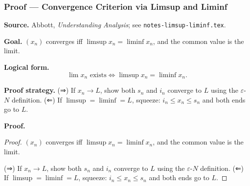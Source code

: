 
\clearpage
{}
\hypertarget{proof-RA-ABB-T-limsup-conv-criterion}{}

\subsubsection[Convergence Criterion via Limsup and Liminf]{Proof --- Convergence Criterion via Limsup and Liminf}

\bigskip

\noindent
\textbf{Source.}
Abbott, \emph{Understanding Analysis}; see \texttt{notes-limsup-liminf.tex}.

\vspace{0.75em}

\noindent
\textbf{Goal.}
$(x_n)$ converges iff $\limsup x_n = \liminf x_n$, and the common value is the limit.

\vspace{0.75em}

\noindent
\textbf{Logical form.}
\[
  \lim x_n \text{ exists} \Longleftrightarrow \limsup x_n = \liminf x_n.
\]

\vspace{0.75em}

\noindent
\textbf{Proof strategy.}
(⇒) If $x_n \to L$, show both $s_n$ and $i_n$ converge to $L$ using the $\varepsilon$-$N$ definition. (⇐) If $\limsup = \liminf = L$, squeeze: $i_n \le x_n \le s_n$ and both ends go to $L$.

\vspace{0.75em}

\noindent
\textbf{Proof.}
\begin{proof}
\Claim $(x_n)$ converges iff $\limsup x_n = \liminf x_n$, and the common value is the limit.

\Given 

\Goal 

\Strategy (⇒) If $x_n \to L$, show both $s_n$ and $i_n$ converge to $L$ using the $\varepsilon$-$N$ definition. (⇐) If $\limsup = \liminf = L$, squeeze: $i_n \le x_n \le s_n$ and both ends go to $L$.

\medskip


\end{proof}

